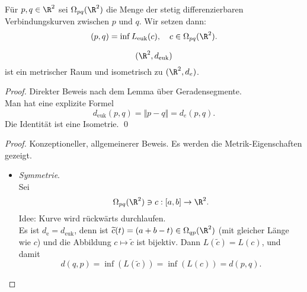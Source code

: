 \begin{definition}
  Für \( p,q \in \R^2 \) sei \( \Omega_{pq}(\R^2) \) die Menge der stetig differenzierbaren Verbindungskurven zwischen \( p \) und \( q \). Wir setzen dann:
  \begin{equation*}
    (p,q) = \inf L_\text{euk}(c), \quad c \in \Omega_{pq}(\R^2)\text{.}
  \end{equation*}
\end{definition}

\begin{theorem}
  \begin{equation*}
    (\R^2, d_\text{euk})
  \end{equation*}
  ist ein metrischer Raum und isometrisch zu \( (\R^2, d_e) \).
  \begin{proof}
    Direkter Beweis nach dem Lemma über Geradensegmente. \\
    Man hat eine explizite Formel
    \begin{equation*}
      d_{\text{euk}}(p,q) = \Vert p - q \Vert = d_e(p,q)\text{.}
    \end{equation*}
    Die Identität ist eine Isometrie. \qed{}
  \end{proof}
  \begin{proof}
    Konzeptioneller, allgemeinerer Beweis. Es werden die Metrik-Eigenschaften gezeigt.

    \begin{itemize}
      \item \emph{Symmetrie}. \\
        Sei
        \begin{equation*}
          \Omega_{pq}(\R^2) \ni c: [a,b] \to \R^2\text{.}
       \end{equation*}
       Idee: Kurve wird rückwärts durchlaufen. \\
       Es ist \( d_\text{e} = d_\text{euk} \), denn ist \( \widetilde{c}(t) = (a+b-t) \in \Omega_{qp}(\R^2) \) (mit gleicher Länge wie \( c \)) und die Abbildung \( c \mapsto \widetilde{c} \) ist bijektiv. Dann \( L(\widetilde{c}) = L(c) \), und damit
       \begin{equation*}
         d(q,p) = \inf(L(\widetilde{c})) = \inf(L(c)) = d(p,q)\text{.}
       \end{equation*}


\end{itemize}
\end{proof}
\end{theorem}
